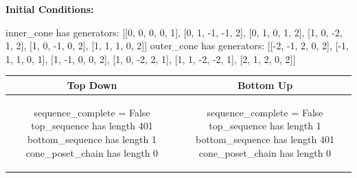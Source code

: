 \documentclass[10pt]{article}
\begin{document}
\textbf{Initial Conditions:}
\begin{SAGE}
inner_cone has generators: 
[[0, 0, 0, 0, 1], [0, 1, -1, -1, 2], [0, 1, 0, 1, 2], [1, 0, -2, 1, 2], [1, 0, -1, 0, 2], [1, 1, 1, 0, 2]]
outer_cone has generators: 
[[-2, -1, 2, 0, 2], [-1, 1, 1, 0, 1], [1, -1, 0, 0, 2], [1, 0, -2, 2, 1], [1, 1, -2, -2, 1], [2, 1, 2, 0, 2]]

\end{SAGE}
\begin{tabular}{c|c}
\textbf{Top Down} & \textbf{Bottom Up} \\ \hline  
\begin{SAGE}
sequence_complete = False
top_sequence has length 401
bottom_sequence has length 1
cone_poset_chain has length 0
\end{SAGE} 
&
\begin{SAGE}
sequence_complete = False
top_sequence has length 1
bottom_sequence has length 401
cone_poset_chain has length 0
\end{SAGE} 
\\ \hline


\end{tabular}
\end{document}
